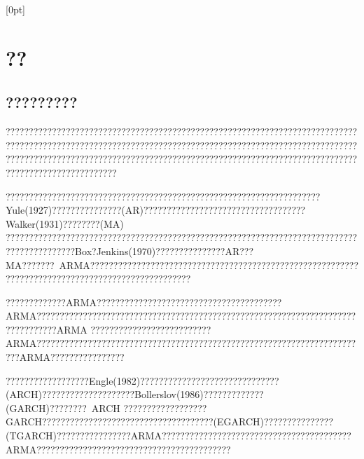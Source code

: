 \documentclass[a4paper,12pt,openany,oneside,utf-8]{ctexbook}
\newcommand{\xiaowuhao}{\fontsize{9pt}{\baselineskip}\selectfont}
\begin{document}
	
	
	\newpage
	\begin{spacing}{1.8}
		\tableofcontents
		[0pt]{\addvspace{2pt}\filright}
		{\contentspush{\thecontentslabel\ }}
		{}{\contentspage}
	\end{spacing}
	
	\mainmatter
	\fancyfoot[EC,OC]{\hspace*{1 em}\thepage{}\hspace*{1 em}}
	\normalsize
	\chapter[??]{??}\fancyhead[C]{\xiaowuhao}
	\section{?????????}
	
	????????????????????????????????????????????????????????????????????????????????????????????????????????????????????????????????????????????????????????????????????????????????????????????????????????????????????????????????????????????????????????????
	
	????????????????????????????????????????????????????????????????????Yule(1927)???????????????(AR)???????????????????????????????????Walker(1931)????????(MA) ???????????????????????????????????????????????????????????????????????????????????????????Box?Jenkins(1970)???????????????AR???MA???????~ARMA??????????????????????????????????????????????????????????????????????????????????????????????????
	
	?????????????ARMA????????????????????????????????????????ARMA????????????????????????????????????????????????????????????????????????????????ARMA ??????????????????????????ARMA????????????????????????????????????????????????????????????????????????ARMA????????????????
	
	??????????????????Engle(1982)??????????????????????????????(ARCH)????????????????????Bollerslov(1986)?????????????(GARCH)????????~ARCH ??????????????????GARCH?????????????????????????????????????(EGARCH)???????????????(TGARCH)????????????????ARMA?????????????????????????????????????????ARMA??????????????????????????????????????????
	
\end{document}
